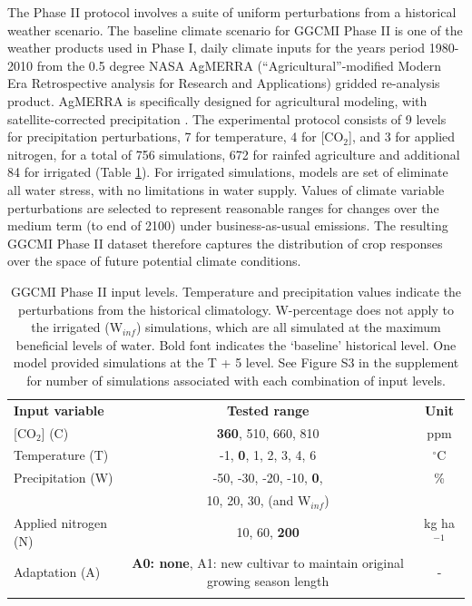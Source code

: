 \documentclass[gmd, manuscript]{copernicus} %
\begin{document}
{The Phase II protocol involves a suite of uniform perturbations from a historical weather scenario. 
The baseline climate scenario for GGCMI Phase II is one of the weather products used in Phase I, daily climate inputs for the years period 1980-2010 from the 0.5 degree NASA AgMERRA (``Agricultural''-modified Modern Era Retrospective analysis for Research and Applications) gridded re-analysis product. AgMERRA is specifically designed for agricultural modeling, with satellite-corrected precipitation \citep{Ruane2015}. 
The experimental protocol consists of 9 levels for precipitation perturbations, 7 for temperature, 4 for [CO$_2$], and 3 for applied nitrogen, for a total of 756 simulations, 672 for rainfed agriculture and additional 84 for irrigated (Table \ref{table:inputs}).  For irrigated simulations, models are set of eliminate all water stress, with no limitations in water supply. 
Values of climate variable perturbations are selected to represent reasonable ranges for changes over the medium term (to end of 2100) under business-as-usual emissions. 
The resulting GGCMI Phase II dataset therefore captures the distribution of crop responses over the space of future potential climate conditions.


\begin{table}[t]
\caption{GGCMI Phase II input levels. Temperature and precipitation values indicate the perturbations from the historical climatology. W-percentage does not apply to the irrigated (W$_{inf}$) simulations, which are all simulated at the maximum beneficial levels of water. Bold font indicates the `baseline' historical level. One model provided simulations at the T + 5 level. See Figure S3 in the supplement for number of simulations associated with each combination of input levels.}
\label{table:inputs} 
    \begin{tabular}{lcc} 
        \tophline \vspace{1mm}
        \textbf{Input variable} & \textbf{Tested range} & \textbf{Unit} \\ \middlehline \vspace{1mm}
        [CO$_2$] (C) & \textbf{360}, 510, 660, 810 & ppm\\ \middlehline \vspace{1mm}
        Temperature (T) & -1, \textbf{0}, 1, 2, 3, 4, 6 & $^{\circ}$C\\ \middlehline \vspace{1mm}
        Precipitation (W) & -50, -30, -20, -10, \textbf{0}, & \% \\
        {} & 10, 20, 30, (and W$_{inf}$) & {} \\ \middlehline \vspace{1mm}
        Applied nitrogen (N) & 10, 60, \textbf{200} & kg ha$^{-1}$ \\ \middlehline \vspace{1mm}
        Adaptation (A) & \textbf{A0: none}, A1: new cultivar to maintain original growing season length & -\\ \bottomhline
    \end{tabular}\\
\end{table}


}
\end{document}
